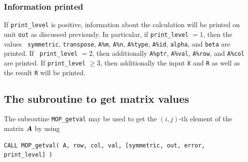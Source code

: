 \documentclass{galahad}
\newcommand{\packagename}{MOP}
\begin{document}
\subsubsection{Information printed}\label{Ax-info}

If {\tt print\_level} is positive, information about the calculation
will be printed on unit {\tt out} as discussed previously.  In
particular, if {\tt print\_level} $= 1$, then the values {\tt
  symmetric}, {\tt transpose}, {\tt A\%m}, {\tt A\%n}, {\tt A\%type},
{\tt A\%id}, {\tt alpha}, and {\tt beta} are printed.  If {\tt
  print\_level} $= 2$, then additionally {\tt A\%ptr}, {\tt A\%val},
{\tt A\%row}, and {\tt A\%col} are printed.  If {\tt print\_level}
$\geq 3$, then additionally the input {\tt X} and {\tt R} as well as
the result {\tt R} will be printed.


\subsection{The subroutine to get matrix values}\label{getval}

The subroutine {\tt \packagename\_getval} may be used to get the
$(i,j)$-th element of the matrix ${\bm{A}}$ by using
\vspace*{1mm}

\hspace{8mm}
{\tt CALL \packagename\_getval( A, row, col, val, [symmetric, out,
                                error, print\_level] )}
\end{document}
